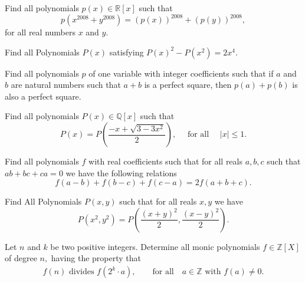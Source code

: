 \documentclass[12pt,a4paper]{memoir}
\theoremstyle{definition}
\begin{document}
\begin{question}
	Find all polynomials $ p(x)\in \mathbb{R}[x]$ such that \[p(x^{2008} + y^{2008}) = (p(x))^{2008}+(p(y))^{2008},\] for all real numbers $x$ and $y$.
\end{question}





\begin{question}
	Find all Polynomials $P(x)$ satisfying $P(x)^2-P(x^2) =2x^4$.
\end{question}





\begin{question}
	Find all polynomials $ p$ of one variable with integer coefficients such that if $ a$ and $ b$ are natural numbers such that $ a +b$ is a perfect square, then $ p\left(a\right)+ p\left(b\right)$ is also a perfect square.
\end{question}





\begin{question}
	Find all polynomials $P(x)\in \mathbb Q[x]$ such that
	\[P(x)=P\left(\frac{-x+\sqrt{3 -3x^2}}{2}\right), \quad \text{ for all } \quad |x| \le 1.\]
\end{question}





\begin{question}
	Find all polynomials $f$ with real coefficients such that for all reals $a,b,c$ such that $ab+bc+ca = 0$ we have the following relations
	\[ f(a-b) + f(b-c) + f(c-a) = 2f(a+b+c). \]
\end{question}





\begin{question}
	Find All Polynomials $ P(x,y)$ such that for all reals $ x,y$ we have
	\[P(x^{2},y^{2}) =P\left(\frac {(x + y)^{2}}{2},\frac {(x - y)^{2}}{2}\right).\]
\end{question}





\begin{question}
	Let $ n$ and $ k$ be two positive integers. Determine all monic polynomials $ f\in\mathbb{Z}[X]$ of degree $ n,$ having the property that 
	\begin{align*}
		f(n) \text{ divides } f\left (2^{k}\cdot a\right ), \qquad \text{for all} \quad  a\in\mathbb{Z} \text{ with } f(a)\neq 0.
	\end{align*}
\end{question}
\end{document}
